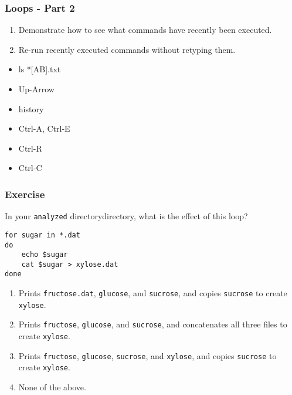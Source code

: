 \documentclass[xcolor=dvipsnames]{beamer}
\begin{document}
\begin{frame}
\frametitle{Loops - Part 2}
\begin{enumerate}
  \item Demonstrate how to see what commands have recently been executed.
  \item Re-run recently executed commands without retyping them.
\end{enumerate}
\begin{multicols}{2}
\begin{itemize}
  \item ls *[AB].txt
  \item Up-Arrow
  \item history
  \item Ctrl-A, Ctrl-E
  \item Ctrl-R
  \item Ctrl-C
\end{itemize}
\end{multicols}
\end{frame}


\begin{frame}[fragile]
\frametitle{Exercise}
In your {\tt analyzed} directorydirectory, what is the effect of this loop?

\begin{verbatim}
for sugar in *.dat
do
    echo $sugar
    cat $sugar > xylose.dat
done
\end{verbatim}
\begin{enumerate}
\item Prints {\tt fructose.dat}, {\tt glucose}, and {\tt sucrose}, and copies {\tt sucrose} to create {\tt xylose}.
\item Prints {\tt fructose}, {\tt glucose}, and {\tt sucrose}, and concatenates all three files to create {\tt xylose}.
\item Prints {\tt fructose}, {\tt glucose}, {\tt sucrose}, and {\tt xylose}, and copies {\tt sucrose} to create {\tt xylose}.
\item None of the above.
\end{enumerate}
\end{frame}
\end{document}
